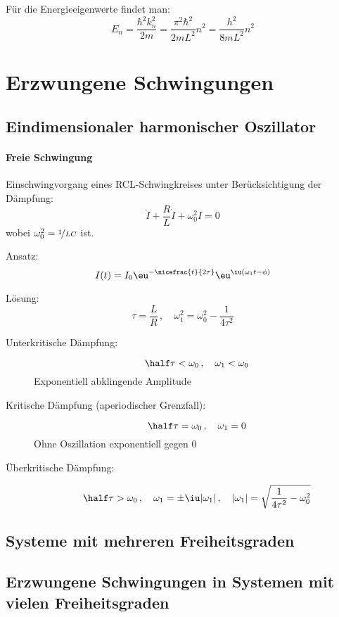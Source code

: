			Für die Energieeigenwerte findet man:
			\[
				E_n = \frac{\hbar^2 k_n^2}{2m} = \frac{\pi^2 \hbar^2}{2m L^2}n^2
					  = \frac{h^2}{8mL^2} n^2
			\]
\section{Erzwungene Schwingungen} %
	\subsection{Eindimensionaler harmonischer Oszillator} %
		\paragraph{Freie Schwingung} %
			Einschwingvorgang eines RCL-Schwingkreises unter Berücksichtigung der Dämpfung:
			\[
				\ddot I + \frac RL \dot I + \omega_0^2 I = 0
			\]
			wobei $\omega_0^2 = \nicefrac 1{LC}$ ist.
			
			Ansatz:
			\[
				I(t) = I_0 \eu^{-\nicefrac{t}{2\tau}} \eu^{\iu(\omega_1 t - \phi)}
			\]
			
			Lösung:
			\[
				\tau = \frac LR \,,\quad \omega_1^2 = \omega_0^2 - \frac{1}{4\tau^2}
			\]
			
			\begin{description}
				\item[Unterkritische Dämpfung:] \[
					\half\tau < \omega_0 \,, \quad \omega_1 < \omega_0
				\]
				Exponentiell abklingende Amplitude
				\item[Kritische Dämpfung (aperiodischer Grenzfall):] \[
					\half \tau = \omega_0 \,,\quad \omega_1 = 0
				\]
				Ohne Oszillation exponentiell gegen 0
				\item[Überkritische Dämpfung:] \[
					\half \tau > \omega_0 \,,\quad \omega_1 = \pm \iu |\omega_1| \,,\quad |\omega_1| = \sqrt{\frac{1}{4\tau^2} - \omega_0^2}
				\]
			\end{description}
	\subsection{Systeme mit mehreren Freiheitsgraden} %
		
	\subsection{Erzwungene Schwingungen in Systemen mit vielen Freiheitsgraden} %
